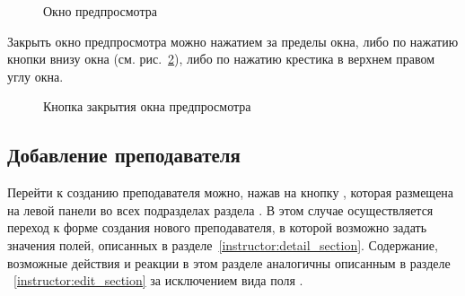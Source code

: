 \begin{figure}[H]
	\caption{Окно предпросмотра}
	\label{instructor:edit_preview}
\end{figure}	

Закрыть окно предпросмотра можно нажатием за пределы окна, либо по нажатию кнопки  внизу окна (см. рис.~\ref{instructor:preview_close_button}), либо по нажатию крестика в верхнем правом углу окна. 

\begin{figure}[H]
	\caption{Кнопка закрытия окна предпросмотра}
	\label{instructor:preview_close_button}
\end{figure}


\subsection{Добавление преподавателя}
Перейти к созданию преподавателя можно, нажав на кнопку , которая размещена на левой панели во всех подразделах раздела . В этом случае осуществляется переход к форме создания нового преподавателя, в которой возможно задать значения полей, описанных в разделе~\ref{instructor:detail_section}. Содержание, возможные действия и реакции в этом разделе аналогичны описанным в разделе ~\ref{instructor:edit_section} за исключением вида поля .



